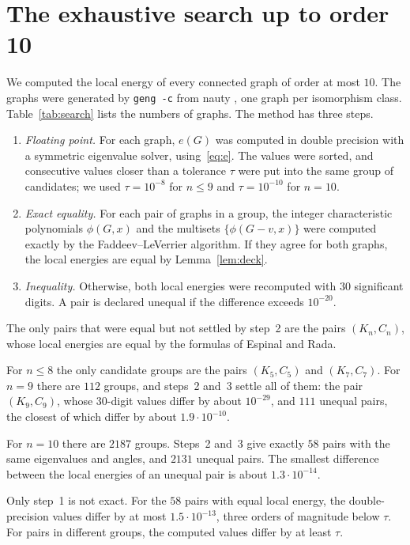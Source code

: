 \documentclass[11pt]{amsart}
\theoremstyle{remark}
\begin{document}
\section{The exhaustive search up to order 10}\label{sec:search}

We computed the local energy of every connected graph of order at most $10$.
The graphs were generated by \texttt{geng -c} from nauty \cite{MP}, one graph per isomorphism class.
Table~\ref{tab:search} lists the numbers of graphs.
The method has three steps.
\begin{enumerate}
\item \emph{Floating point.} For each graph, $e(G)$ was computed in double precision with a symmetric eigenvalue solver, using~\eqref{eq:e}.
The values were sorted, and consecutive values closer than a tolerance $\tau$ were put into the same group of candidates; we used $\tau=10^{-8}$ for $n\le9$ and $\tau=10^{-10}$ for $n=10$.
\item \emph{Exact equality.} For each pair of graphs in a group, the integer characteristic polynomials $\phi(G,x)$ and the multisets $\{\phi(G-v,x)\}$ were computed exactly by the Faddeev--LeVerrier algorithm.
If they agree for both graphs, the local energies are equal by Lemma~\ref{lem:deck}.
\item \emph{Inequality.} Otherwise, both local energies were recomputed with $30$ significant digits.
A pair is declared unequal if the difference exceeds $10^{-20}$.
\end{enumerate}
The only pairs that were equal but not settled by step~2 are the pairs $(K_n,C_n)$, whose local energies are equal by the formulas of Espinal and Rada.

For $n\le8$ the only candidate groups are the pairs $(K_5,C_5)$ and $(K_7,C_7)$.
For $n=9$ there are $112$ groups, and steps~2 and~3 settle all of them: the pair $(K_9,C_9)$, whose $30$-digit values differ by about $10^{-29}$, and $111$ unequal pairs, the closest of which differ by about $1.9\cdot10^{-10}$.

For $n=10$ there are $2187$ groups.
Steps~2 and~3 give exactly $58$ pairs with the same eigenvalues and angles, and $2131$ unequal pairs.
The smallest difference between the local energies of an unequal pair is about $1.3\cdot10^{-14}$.

Only step~1 is not exact.
For the $58$ pairs with equal local energy, the double-precision values differ by at most $1.5\cdot10^{-13}$, three orders of magnitude below $\tau$.
For pairs in different groups, the computed values differ by at least $\tau$.
\end{document}
